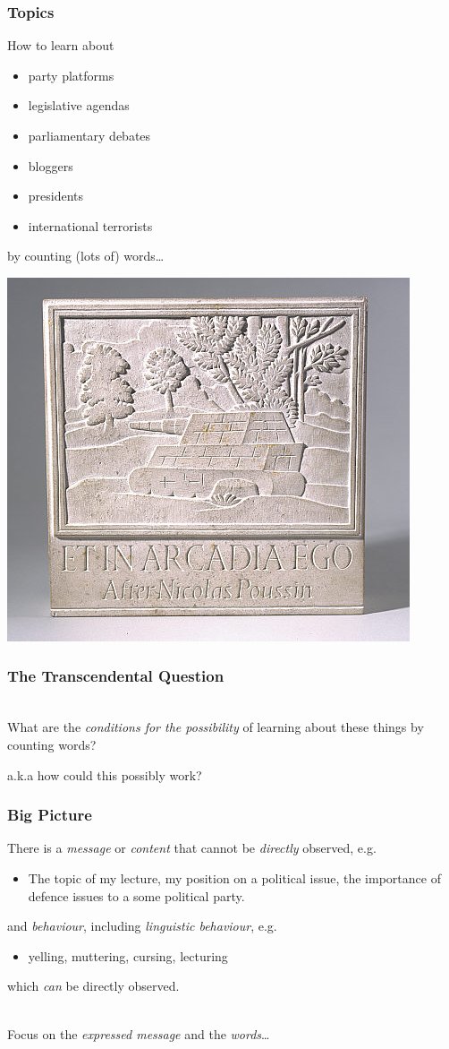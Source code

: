 \documentclass[11pt,compress,professionalfonts]{beamer}
\newcommand{\ita}{\begin{itemize}}
\newcommand{\itm}{\item[]}
\newcommand{\itz}{\end{itemize}}
\begin{document}
\begin{frame}[t]\frametitle{Topics}
How to learn about
\ita
\itm party platforms
\itm legislative agendas
\itm parliamentary debates
\itm bloggers
\itm presidents
\itm international terrorists
\itz
by counting (lots of) words\ldots


\centerline{\includegraphics[scale=4]{pictures/etinarcadiaego}}

\end{frame}
\begin{frame}[t]\frametitle{The Transcendental Question}
~\\
What are the \textit{conditions for the possibility} of learning about these things by counting words?

\vfill
a.k.a how could this possibly work?

\end{frame}
\begin{frame}[t]\frametitle{Big Picture}

There is a \textsl{message} or \textit{content} that cannot be \textit{directly} observed, e.g.
\ita
\itm The topic of my lecture, my position on a political issue, the importance of defence issues to a some political party.
\itz
and \textit{behaviour}, including \textsl{linguistic behaviour}, e.g.
\ita
\itm yelling, muttering, cursing, lecturing
\itz
which \textit{can} be directly observed.

~\\
Focus on the \textit{expressed message} and the \textit{words}\ldots

\end{frame}
\end{document}
